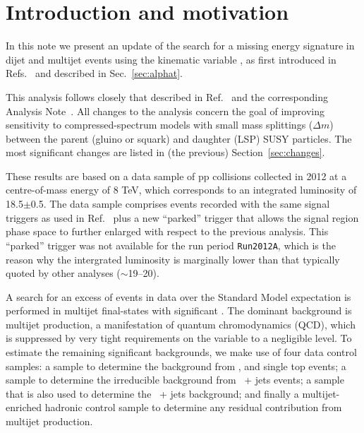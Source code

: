 \clearpage
\section{Introduction and motivation\label{sec:intro}}

In this note we present an update of the search for a missing energy
signature in dijet and multijet events using the kinematic variable
\alphat, as first introduced in Refs.~\cite{Randall:2008rw,
  cms-pas-sus-08005, cms-pas-sus-09001} and described in
Sec.~\ref{sec:alphat}. 

This analysis follows closely that described in
Ref.~\cite{RA1Paper2012} and the corresponding Analysis
Note~\cite{RA1Paper2012ANHCP}. All changes to the analysis concern the
goal of improving sensitivity to compressed-spectrum models with small
mass splittings ($\Delta m$) between the parent (\ie gluino or squark)
and daughter (\ie LSP) SUSY particles. The most significant changes
are listed in (the previous) Section~\ref{sec:changes}.

These results are based on a data sample of pp collisions collected in
2012 at a centre-of-mass energy of 8 TeV, which corresponds to an
integrated luminosity of 18.5$\pm$0.5\fbinv. The data sample comprises
events recorded with the same signal triggers as used in
Ref.~\cite{RA1Paper2012} plus a new ``parked'' trigger that allows the
signal region phase space to further enlarged with respect to the
previous analysis. This ``parked'' trigger was not available for the
run period \verb!Run2012A!, which is the reason why the intergrated
luminosity is marginally lower than that typically quoted by other
analyses (\ie $\sim$19--20\fbinv).

A search for an excess of events in data over the Standard Model
expectation is performed in multijet final-states with significant
\met. The dominant background is multijet production, a manifestation
of quantum chromodynamics (QCD), which is suppressed by very tight
requirements on the \alphat variable to a negligible level. To
estimate the remaining significant backgrounds, we make use of four
data control samples: a \mj sample to determine the background from
\wj, \ttbar and single top events; a \gj sample to determine the
irreducible background from \znunu\ + jets events; a \mmj sample that
is also used to determine the \znunu\ + jets background; and finally a
multijet-enriched hadronic control sample to determine any residual
contribution from multijet production.

